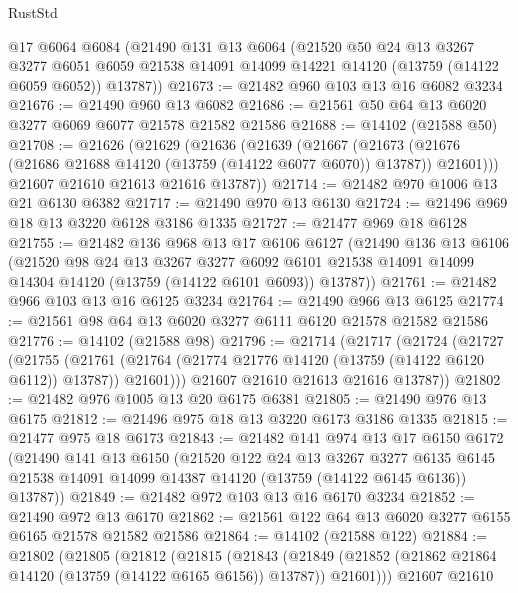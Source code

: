 \begin{lexlean}{RustStd}
\begin{coremodule}
    @17
    @6064
    @6084
    (@21490
      @131
      @13
      @6064
      (@21520
        @50
        @24
        @13
        @3267
        @3277
        @6051
        @6059
        @21538
        @14091
        @14099
        @14221
        @14120
        (@13759 (@14122 @6059 @6052))
        @13787))
@21673 := @21482 @960 @103 @13 @16 @6082 @3234
@21676 := @21490 @960 @13 @6082
@21686 := @21561 @50 @64 @13 @6020 @3277 @6069 @6077 @21578 @21582 @21586
@21688 := @14102 (@21588 @50)
@21708 := @21626
    (@21629
      (@21636
        (@21639
          (@21667
            (@21673 (@21676 (@21686 @21688 @14120 (@13759 (@14122 @6077 @6070)) @13787)) @21601)))
        @21607
        @21610
        @21613
        @21616
        @13787))
@21714 := @21482 @970 @1006 @13 @21 @6130 @6382
@21717 := @21490 @970 @13 @6130
@21724 := @21496 @969 @18 @13 @3220 @6128 @3186 @1335
@21727 := @21477 @969 @18 @6128
@21755 := @21482
    @136
    @968
    @13
    @17
    @6106
    @6127
    (@21490
      @136
      @13
      @6106
      (@21520
        @98
        @24
        @13
        @3267
        @3277
        @6092
        @6101
        @21538
        @14091
        @14099
        @14304
        @14120
        (@13759 (@14122 @6101 @6093))
        @13787))
@21761 := @21482 @966 @103 @13 @16 @6125 @3234
@21764 := @21490 @966 @13 @6125
@21774 := @21561 @98 @64 @13 @6020 @3277 @6111 @6120 @21578 @21582 @21586
@21776 := @14102 (@21588 @98)
@21796 := @21714
    (@21717
      (@21724
        (@21727
          (@21755
            (@21761 (@21764 (@21774 @21776 @14120 (@13759 (@14122 @6120 @6112)) @13787)) @21601)))
        @21607
        @21610
        @21613
        @21616
        @13787))
@21802 := @21482 @976 @1005 @13 @20 @6175 @6381
@21805 := @21490 @976 @13 @6175
@21812 := @21496 @975 @18 @13 @3220 @6173 @3186 @1335
@21815 := @21477 @975 @18 @6173
@21843 := @21482
    @141
    @974
    @13
    @17
    @6150
    @6172
    (@21490
      @141
      @13
      @6150
      (@21520
        @122
        @24
        @13
        @3267
        @3277
        @6135
        @6145
        @21538
        @14091
        @14099
        @14387
        @14120
        (@13759 (@14122 @6145 @6136))
        @13787))
@21849 := @21482 @972 @103 @13 @16 @6170 @3234
@21852 := @21490 @972 @13 @6170
@21862 := @21561 @122 @64 @13 @6020 @3277 @6155 @6165 @21578 @21582 @21586
@21864 := @14102 (@21588 @122)
@21884 := @21802
    (@21805
      (@21812
        (@21815
          (@21843
            (@21849 (@21852 (@21862 @21864 @14120 (@13759 (@14122 @6165 @6156)) @13787)) @21601)))
        @21607
        @21610

\end{coremodule}
\end{lexlean}
